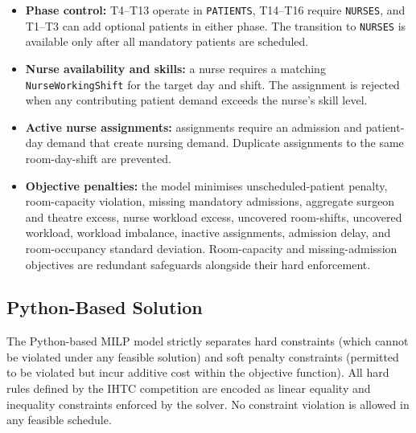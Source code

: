 \documentclass[11pt,a4paper]{article}
\begin{document}
\begin{itemize}
    \item \textbf{Phase control:} T4--T13 operate in \texttt{PATIENTS}, T14--T16 require \texttt{NURSES}, and T1--T3 can add optional patients in either phase. The transition to \texttt{NURSES} is available only after all mandatory patients are scheduled.

    \item \textbf{Nurse availability and skills:} a nurse requires a matching \texttt{NurseWorkingShift} for the target day and shift. The assignment is rejected when any contributing patient demand exceeds the nurse's skill level.

    \item \textbf{Active nurse assignments:} assignments require an admission and patient-day demand that create nursing demand. Duplicate assignments to the same room-day-shift are prevented.

    \item \textbf{Objective penalties:} the model minimises unscheduled-patient penalty, room-capacity violation, missing mandatory admissions, aggregate surgeon and theatre excess, nurse workload excess, uncovered room-shifts, uncovered workload, workload imbalance, inactive assignments, admission delay, and room-occupancy standard deviation. Room-capacity and missing-admission objectives are redundant safeguards alongside their hard enforcement.
\end{itemize}

\subsection{Python-Based Solution}
The Python-based MILP model strictly separates hard constraints (which cannot be violated under any feasible solution) and soft penalty constraints (permitted to be violated but incur additive cost within the objective function). All hard rules defined by the IHTC competition are encoded as linear equality and inequality constraints enforced by the solver. No constraint violation is allowed in any feasible schedule.
\end{document}
